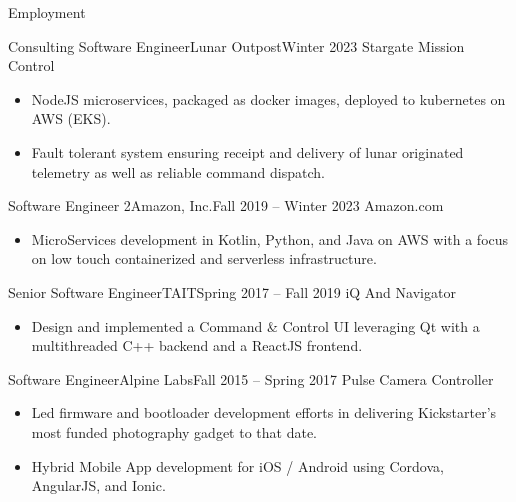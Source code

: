 \documentclass[]{mussocv}
\begin{document}
	\makeheader
	
	\begin{cvsection}{Employment}
		\begin{cvsubsection}{Consulting Software Engineer}{Lunar Outpost}{Winter 2023}
			Stargate Mission Control			
			\begin{itemize}
				\item NodeJS microservices, packaged as docker images, deployed to kubernetes on AWS (EKS). 
				\item Fault tolerant system ensuring receipt and delivery of lunar originated telemetry as well as reliable command dispatch. 
			\end{itemize}
		\end{cvsubsection}
		
		\begin{cvsubsection}{Software Engineer 2}{Amazon, Inc.}{Fall 2019 -- Winter 2023}
			Amazon.com
			\begin{itemize}
				\item MicroServices development in Kotlin, Python, and Java on AWS with a focus on low touch containerized and serverless infrastructure.
			\end{itemize}
		\end{cvsubsection}
		
		\begin{cvsubsection}{Senior Software Engineer}{TAIT}{Spring 2017 -- Fall 2019}
			iQ And Navigator 
			\begin{itemize}
				\item Design and implemented a Command \& Control UI leveraging Qt with a multithreaded C++ backend and a ReactJS frontend.
			\end{itemize}
		\end{cvsubsection}
		
		\begin{cvsubsection}{Software Engineer}{Alpine Labs}{Fall 2015 -- Spring 2017}
			Pulse Camera Controller	
			\begin{itemize}
				\item Led firmware and bootloader development efforts in delivering Kickstarter's most funded photography gadget to that date.
				\item Hybrid Mobile App development for iOS / Android using Cordova, AngularJS, and Ionic.
			\end{itemize}
		\end{cvsubsection}


\end{cvsection}
\end{document}
